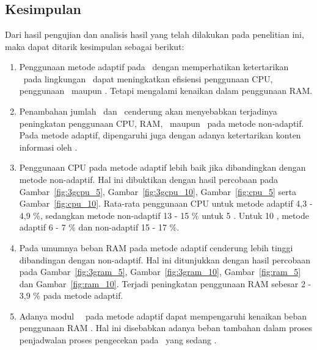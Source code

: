 \chapter{\babLima}

\section{Kesimpulan}

Dari hasil pengujian dan analisis hasil yang telah dilakukan pada penelitian
ini, maka dapat ditarik kesimpulan sebagai berikut:

\begin{enumerate}

\item Penggunaan metode adaptif pada \tracking~dengan memperhatikan ketertarikan
  \subscriber~pada lingkungan \pubsub~dapat meningkatkan efisiensi penggunaan
  CPU, penggunaan \bandwidth~maupun \latency. Tetapi mengalami kenaikan dalam
  penggunaan RAM.

  \item Penambahan jumlah \publisher~dan \subscriber~cenderung akan menyebabkan
    terjadinya peningkatan penggunaan CPU, RAM, \bandwidth~maupun \latency~pada
    metode non-adaptif. Pada metode adaptif, dipengaruhi juga dengan adanya
    ketertarikan konten informasi oleh \subscriber.

  \item Penggunaan CPU pada metode adaptif lebih baik jika dibandingkan dengan
    metode non-adaptif. Hal ini dibuktikan dengan hasil percobaan pada
    Gambar~\ref{fig:3gcpu_5}, Gambar~\ref{fig:3gcpu_10}, Gambar~\ref{fig:cpu_5}
    serta Gambar~\ref{fig:cpu_10}. Rata-rata penggunaan CPU untuk metode adaptif
    4,3 - 4,9 \%, sedangkan metode non-adaptif 13 - 15 \% untuk 5 \subscriber.
    Untuk 10 \subscriber, metode adaptif 6 - 7 \% dan non-adaptif 15 - 17 \%.

  \item Pada umumnya beban RAM pada metode adaptif cenderung lebih tinggi
    dibandingan dengan non-adaptif. Hal ini ditunjukkan dengan hasil percobaan
    pada Gambar~\ref{fig:3gram_5}, Gambar~\ref{fig:3gram_10},
    Gambar~\ref{fig:ram_5} dan Gambar~\ref{fig:ram_10}. Terjadi peningkatan
    penggunaan RAM sebesar 2 - 3,9 \% pada metode adaptif.

  \item Adanya modul \idle~\manager~pada metode adaptif dapat mempengaruhi
    kenaikan beban penggunaan RAM \server. Hal ini disebabkan adanya beban
    tambahan dalam proses penjadwalan proses pengecekan pada \publisher~yang
    sedang \idle.


\end{enumerate}
